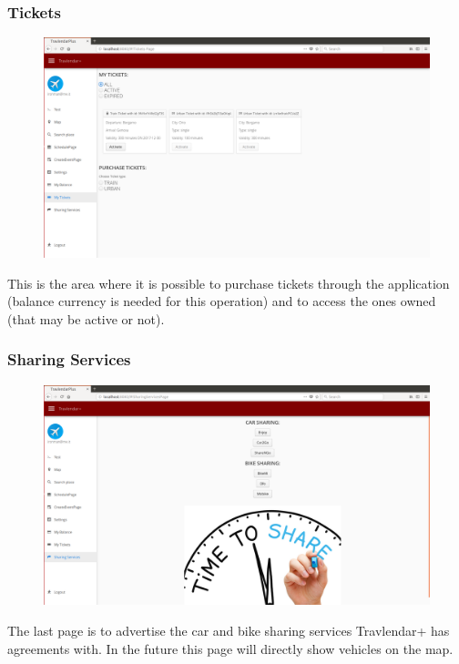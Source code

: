 \documentclass{article}
\begin{document}
			\subsubsection{Tickets}
			\begin{figure}[H]
			\includegraphics[width=\linewidth]{Images/Pages/8-Tickets.png}
			\label{fig:Tickets}
			\end{figure}
		This is the area where it is possible to purchase tickets through the application (balance currency is needed for this operation) and to access the ones owned (that may be active or not).
			\subsubsection{Sharing Services}
			\begin{figure}[H]
			\includegraphics[width=\linewidth]{Images/Pages/9-CSS.png}
			\label{fig:Sharing Services}
			\end{figure}
		The last page is to advertise the car and bike sharing services Travlendar+ has agreements with. In the future this page will directly show vehicles on the map.
\newpage
\end{document}
